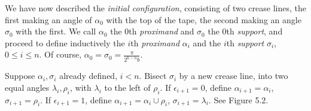 We have now described the \emph{initial configuration}, consisting of two crease lines, the first making an angle of $\alpha_{0}$ with the top of the tape, the second making an angle $\sigma_{0}$ with the first. We call $\alpha_{0}$ the $0$th \emph{proximand} and $\sigma_{0}$ the $0$th \emph{support}, and proceed to define inductively the $i$th \emph{proximand} $\alpha_{i}$ and the $i$th \emph{support} $\sigma_{i}$, $0 \leq i \leq n$. Of course, $\alpha_{0} = \sigma_{0} = \frac{\pi}{2^{k-n} b}$.

Suppose $\alpha_{i},\sigma_{i}$ already defined, $i < n$. Bisect $\sigma_{i}$ by a new crease line, into two equal angles $\lambda_{i},\rho_{i}$, with $\lambda_{i}$ to the left of $\rho_{i}$. If $\epsilon_{i+1} = 0$, define $\alpha_{i+1} = \alpha_{i}$, $\sigma_{i+1} = \rho_{i}$. If $\epsilon_{i+1} = 1$, define $\alpha_{i+1} = \alpha_{i} \cup \rho_{i}$, $\sigma_{i+1} = \lambda_{i}$. See Figure 5.2.

